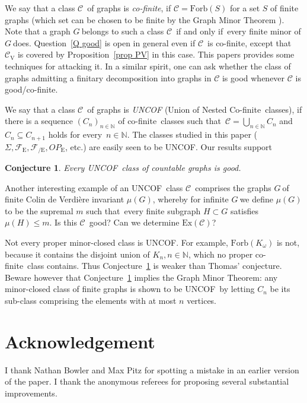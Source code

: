 \documentclass{article}
\newcommand{\forb}[1]{\mathrm{Forb}(#1)}
\newcommand{\ex}[1]{\mathrm{Ex}(#1)}
\newcommand{\frs}{\mathcal{F}}
\newcommand{\frsE}{\frs_\mathrm{E}}
\newcommand{\frsCE}{\frs_\mathrm{{/E}}}
\newcommand{\rmv}[1]{\ensuremath{#1_{\mathrm{V}}}}
\newcommand{\rme}[1]{\ensuremath{#1_{\mathrm{E}}}}
\newcommand{\ope}{\rme{OP}}
\newcommand{\cof}{co-finite}
\newcommand{\Cof}{Co-finite}
\newcommand{\uncof}{UNCOF}
\newcommand{\Sig}{\ensuremath{\Sigma}}
\newcommand{\comment}[1]{}
\newcommand{\defi}[1]{{\color{darkgray}\emph{#1}}}
\newcommand{\acknowledgement}{\section*{Acknowledgement}}
\newtheorem{lemma}[proposition]{Lemma}
\newtheorem{conjecture}{{Conjecture}}[section]
\newtheorem{problem}[conjecture]{{Problem}}
\newcommand{\N}{\ensuremath{\mathbb N}}
\newcommand{\cc}{\ensuremath{\mathcal C}}
\newcommand{\nin}{\ensuremath{{n\in\N}}}
\newcommand{\seq}[1]{\ensuremath{(#1_n)_{n\in\N}}}
\newcommand{\g}{\ensuremath{G\ }}
\newcommand{\Prr}[1]{Pro\-position~\ref{#1}}
\newcommand{\Cnr}[1]{Con\-jecture~\ref{#1}}
\newcommand{\Qr}[1]{Question~\ref{#1}}
\renewcommand{\iff}{if and only if}
\newcommand{\fe}{for every}
\newcommand{\st}{such that}
\begin{document}
We say that a class \cc\ of graphs is \defi{\cof}, if $\cc = \forb{S}$ for a set $S$ of finite graphs (which set can be chosen to be finite by the Graph Minor Theorem \cite{GMXX}). Note that a graph \g belongs to such a class \cc\ \iff\ every finite minor of \g does. \Qr{Q good} is open in general even if \cc\ is \cof, except that $\rmv{\cc}$ is covered by \Prr{prop PV} in this case. This papers provides some techniques for attacking it. In a similar spirit, one can ask whether the class of graphs admitting a finitary decomposition into graphs in $\cc$ is good whenever $\cc$ is good/\cof.

We say that a class \cc\ of graphs is \defi{\uncof} (Union of Nested \Cof\ classes), if there is a sequence \seq{C} of \cof\ classes \st\ $\cc=\bigcup_{\nin} C_n$ and $C_n \subseteq C_{n+1}$ holds \fe\ $\nin$. The classes studied in this paper ($\Sig,\frsE,\frsCE, \ope$, etc.) are easily seen to be \uncof. Our results support


\begin{conjecture} \label{Con good}
Every \uncof\ class of countable graphs is good.
\end{conjecture}

Another interesting example of an \uncof\ class \cc\ comprises the graphs \g of finite Colin de Verdi\`ere invariant $\mu(G)$, whereby for infinite \g we define  $\mu(G)$ to be the supremal $m$ \st\ every finite subgraph $H\subset G$ satisfies $\mu(H)\leq m$. Is this \cc\ good? Can we determine $\ex{\cc}$? 

Not every proper minor-closed class is \uncof. For example, $\forb{K_\omega}$ is not, because it contains the disjoint union of $K_n, \nin$, which no proper \cof\ class contains. Thus \Cnr{Con good} is weaker than Thomas' conjecture. Beware however that \Cnr{Con good} implies the Graph Minor Theorem: any minor-closed class of finite graphs is shown to be \uncof\ by letting $C_n$ be its sub-class comprising the elements with at most $n$ vertices.

\acknowledgement{I thank Nathan Bowler and Max Pitz for spotting a mistake in an earlier version of the paper. I thank the anonymous referees for proposing several substantial improvements.}

\comment{
	\begin{lemma} \label{lem}


\end{lemma}
\begin{proof}

\end{proof}

\begin{problem} \label{}

\end{problem} 
}
\end{document}
